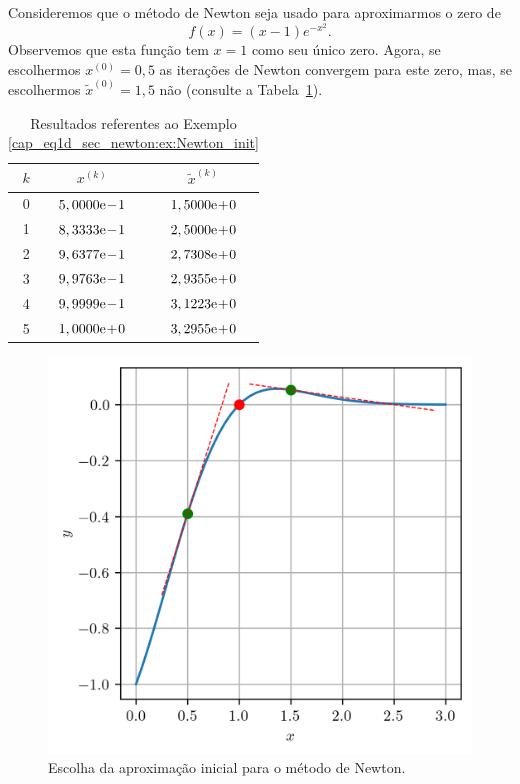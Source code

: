 \begin{ex}\label{cap_eq1d_sec_newton:ex:Newton_init}
  Consideremos que o método de Newton seja usado para aproximarmos o zero de
  \begin{equation}
    f(x) = (x-1)e^{-x^2}.
  \end{equation}
Observemos que esta função tem $x=1$ como seu único zero. Agora, se escolhermos $x^{(0)} = 0,5$ as iterações de Newton convergem para este zero, mas, se escolhermos $\tilde{x}^{(0)}=1,5$ não (consulte a Tabela~\ref{cap_eq1d_sec_newton:tab:ex_Newton_init}).

\begin{table}[H]
  \centering
  \caption{Resultados referentes ao Exemplo \ref{cap_eq1d_sec_newton:ex:Newton_init}}
  \label{cap_eq1d_sec_newton:tab:ex_Newton_init}
  \begin{tabular}{r|cc}
    $k$ & $x^{(k)}$   & $\tilde{x}^{(k)}$ \\\hline
    0 & $5,0000\mathrm{e}\!-\!1$ & $1,5000\mathrm{e}\!+\!0$ \\
    1 & $8,3333\mathrm{e}\!-\!1$ & $2,5000\mathrm{e}\!+\!0$ \\
    2 & $9,6377\mathrm{e}\!-\!1$ & $2,7308\mathrm{e}\!+\!0$ \\
    3 & $9,9763\mathrm{e}\!-\!1$ & $2,9355\mathrm{e}\!+\!0$ \\
    4 & $9,9999\mathrm{e}\!-\!1$ & $3,1223\mathrm{e}\!+\!0$ \\
    5 & $1,0000\mathrm{e}\!+\!0$ & $3,2955\mathrm{e}\!+\!0$ \\
  \end{tabular}
\end{table}

\begin{figure}[H]
  \centering
  \includegraphics[width=\textwidth]{./cap_eq1d/dados/fig_newton_ex_init/fig}
  \caption{Escolha da aproximação inicial para o método de Newton.}
  \label{cap_eq1d_sec_newton:fig:ex_Newton_init}
\end{figure}


\end{ex}

